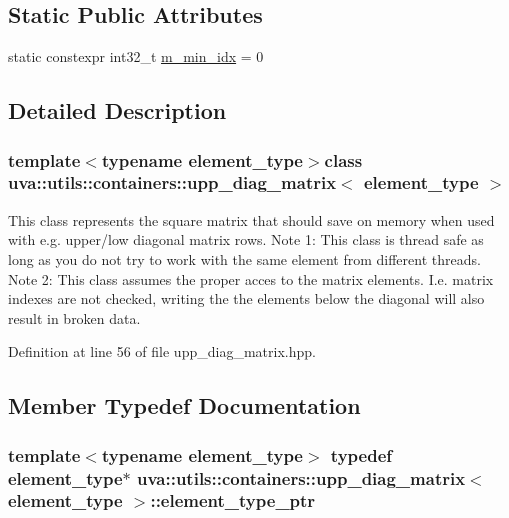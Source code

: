 \subsection*{Static Public Attributes}
\begin{DoxyCompactItemize}
\item 
static constexpr int32\+\_\+t \hyperlink{classuva_1_1utils_1_1containers_1_1upp__diag__matrix_a5ec8fd06a3b9cd57657a6cb0b651196c}{m\+\_\+min\+\_\+idx} = 0
\end{DoxyCompactItemize}


\subsection{Detailed Description}
\subsubsection*{template$<$typename element\+\_\+type$>$class uva\+::utils\+::containers\+::upp\+\_\+diag\+\_\+matrix$<$ element\+\_\+type $>$}

This class represents the square matrix that should save on memory when used with e.\+g. upper/low diagonal matrix rows. Note 1\+: This class is thread safe as long as you do not try to work with the same element from different threads. Note 2\+: This class assumes the proper acces to the matrix elements. I.\+e. matrix indexes are not checked, writing the the elements below the diagonal will also result in broken data. 

Definition at line 56 of file upp\+\_\+diag\+\_\+matrix.\+hpp.



\subsection{Member Typedef Documentation}
\hypertarget{classuva_1_1utils_1_1containers_1_1upp__diag__matrix_aa99e18b84aa337bcaed5af65471861bb}{}
\subsubsection[{element\+\_\+type\+\_\+ptr}]{\setlength{\rightskip}{0pt plus 5cm}template$<$typename element\+\_\+type$>$ typedef element\+\_\+type$\ast$ {\bf uva\+::utils\+::containers\+::upp\+\_\+diag\+\_\+matrix}$<$ element\+\_\+type $>$\+::{\bf element\+\_\+type\+\_\+ptr}}\label{classuva_1_1utils_1_1containers_1_1upp__diag__matrix_aa99e18b84aa337bcaed5af65471861bb}


